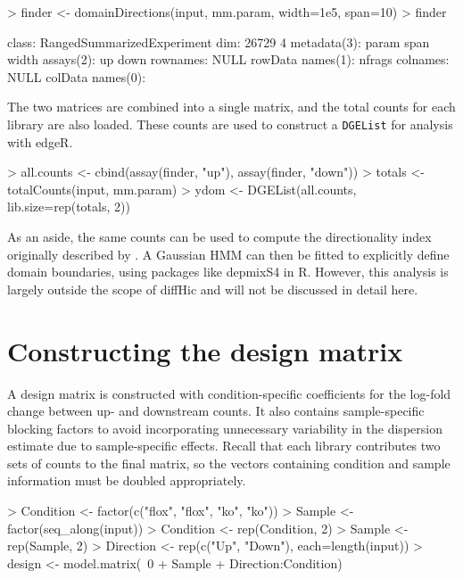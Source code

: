 \documentclass[12pt]{report}
\renewenvironment{Schunk}{\vspace{0pt}}{\vspace{0pt}}
\newcommand{\edgeR}{edgeR}
\newcommand{\pkgname}{diffHic}
\newcommand{\code}[1]{{\small\texttt{#1}}}
\newcommand{\R}{\textsf{R}}
\begin{document}
\begin{Schunk}
\begin{Sinput}
> finder <- domainDirections(input, mm.param, width=1e5, span=10)
> finder
\end{Sinput}
\begin{Soutput}
class: RangedSummarizedExperiment 
dim: 26729 4 
metadata(3): param span width
assays(2): up down
rownames: NULL
rowData names(1): nfrags
colnames: NULL
colData names(0):
\end{Soutput}
\end{Schunk}

The two matrices are combined into a single matrix, and the total counts for each library are also loaded.
These counts are used to construct a \code{DGEList} for analysis with \edgeR{}. 

\begin{Schunk}
\begin{Sinput}
> all.counts <- cbind(assay(finder, "up"), assay(finder, "down"))
> totals <- totalCounts(input, mm.param)
> ydom <- DGEList(all.counts, lib.size=rep(totals, 2))
\end{Sinput}
\end{Schunk}

As an aside, the same counts can be used to compute the directionality index originally described by \cite{dixon2012topological}. 
A Gaussian HMM can then be fitted to explicitly define domain boundaries, using packages like depmixS4 in \R{}.
However, this analysis is largely outside the scope of \pkgname{} and will not be discussed in detail here.

\section{Constructing the design matrix}
A design matrix is constructed with condition-specific coefficients for the log-fold change between up- and downstream counts.
It also contains sample-specific blocking factors to avoid incorporating unnecessary variability in the dispersion estimate due to sample-specific effects.
Recall that each library contributes two sets of counts to the final matrix, so the vectors containing condition and sample information must be doubled appropriately.

\begin{Schunk}
\begin{Sinput}
> Condition <- factor(c("flox", "flox", "ko", "ko"))
> Sample <- factor(seq_along(input))
> Condition <- rep(Condition, 2)
> Sample <- rep(Sample, 2)
> Direction <- rep(c("Up", "Down"), each=length(input))
> design <- model.matrix(~0 + Sample + Direction:Condition)
\end{Sinput}
\end{Schunk}
\end{document}
